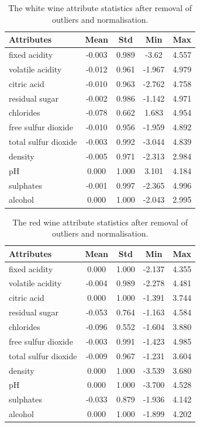 \documentclass[10pt,twocolumn,letterpaper]{article}
\begin{document}
\begin{table}[h]
	\begin{center}
		\begin{tabular}{|l|c|c|c|c|}
			\hline
			Attributes & Mean & Std & Min & Max \\
			\hline
			fixed acidity & -0.003 & 0.989 & -3.62 & 4.557 \\
			volatile acidity & -0.012 & 0.961 & -1.967 & 4.979 \\
			citric acid & -0.010 & 0.963 & -2.762 & 4.758 \\
			residual sugar & -0.002 & 0.986 & -1.142 & 4.971 \\
			chlorides & -0.078 & 0.662 & 1.683 & 4.954 \\
			free sulfur dioxide & -0.010 & 0.956 & -1.959 & 4.892 \\
			total sulfur dioxide & -0.003 & 0.992 & -3.044 & 4.839 \\
			density & -0.005 & 0.971 & -2.313 & 2.984 \\
			pH & 0.000 & 1.000 & 3.101 & 4.184 \\
			sulphates & -0.001 & 0.997 & -2.365 & 4.996 \\
			alcohol & 0.000 & 1.000 & -2.043 & 2.995 \\ 
			\hline
		\end{tabular}
	\end{center}
	\caption{The white wine attribute statistics after removal of outliers and normalisation.}
	\label{tab:normalisedw}
\end{table}

\begin{table}[h]
	\begin{center}
		\begin{tabular}{|l|c|c|c|c|}
			\hline
			Attributes & Mean & Std & Min & Max \\
			\hline
			fixed acidity & 0.000 & 1.000 & -2.137 & 4.355 \\
			volatile acidity & -0.004 & 0.989 & -2.278 & 4.481 \\
			citric acid & 0.000 & 1.000 & -1.391 &  3.744 \\
			residual sugar & -0.053 & 0.764 & -1.163 & 4.584 \\
			chlorides & -0.096 & 0.552 & -1.604 & 3.880 \\
			free sulfur dioxide & -0.003 & 0.991 & -1.423 & 4.985 \\
			total sulfur dioxide & -0.009 & 0.967 & -1.231 & 3.604 \\
			density & 0.000 & 1.000 & -3.539 & 3.680 \\
			pH & 0.000 & 1.000 & -3.700 & 4.528 \\
			sulphates & -0.033 & 0.879 & -1.936 & 4.142 \\
			alcohol & 0.000 & 1.000 & -1.899 & 4.202 \\ 
			\hline
		\end{tabular}
	\end{center}
	\caption{The red wine attribute statistics after removal of outliers and normalisation.}
	\label{tab:normalisedr}
\end{table}
\end{document}
